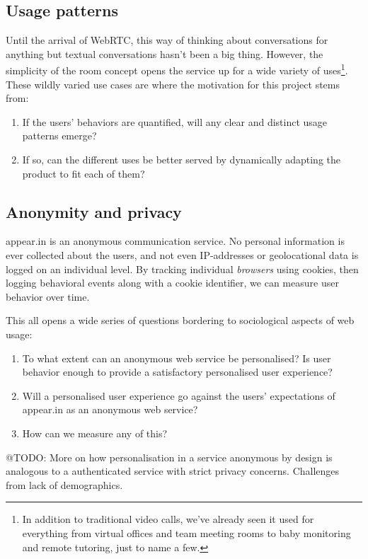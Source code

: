 \subsection{Usage patterns}

Until the arrival of WebRTC, this way of thinking about conversations for anything but textual conversations hasn't been a big thing. However, the simplicity of the room concept opens the service up for a wide variety of uses\footnote{In addition to traditional video calls, we've already seen it used for everything from virtual offices and team meeting rooms to baby monitoring and remote tutoring, just to name a few.}. These wildly varied use cases are where the motivation for this project stems from:

\begin{enumerate}
  \item If the users' behaviors are quantified, will any clear and distinct usage patterns emerge?
  \item If so, can the different uses be better served by dynamically adapting the product to fit each of them?
\end{enumerate}

\subsection{Anonymity and privacy}

appear.in is an anonymous communication service. No personal information is ever collected about the users, and not even IP-addresses or geolocational data is logged on an individual level. By tracking individual \emph{browsers} using cookies, then logging behavioral events along with a cookie identifier, we can measure user behavior over time.

This all opens a wide series of questions bordering to sociological aspects of web usage:

\begin{enumerate}
  \item
    To what extent can an anonymous web service be personalised?
    Is user behavior enough to provide a satisfactory personalised user experience?
  \item
    Will a personalised user experience go against the users' expectations of appear.in as an anonymous web service?
  \item
    How can we measure any of this?
\end{enumerate}

@TODO: More on how personalisation in a service anonymous by design is analogous to a authenticated service with strict privacy concerns. Challenges from lack of demographics.

